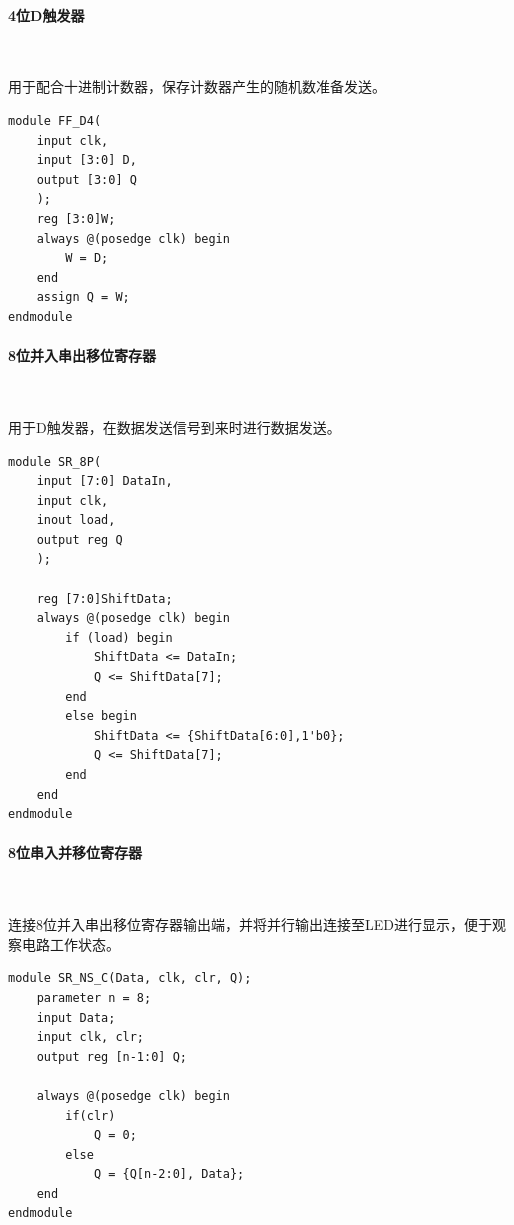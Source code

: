 \documentclass[UTF8]{ctexart}
\numberwithin{figure}{subsection}
\numberwithin{table}{subsection}
\numberwithin{equation}{subsection}
\begin{document}
\paragraph{4位D触发器}~
\par 用于配合十进制计数器，保存计数器产生的随机数准备发送。
\begin{lstlisting}[style={verilog-style}]
module FF_D4(
    input clk,
    input [3:0] D,
    output [3:0] Q
    );
    reg [3:0]W;
    always @(posedge clk) begin
        W = D;
    end
    assign Q = W;
endmodule
\end{lstlisting}

\paragraph{8位并入串出移位寄存器}~
\par 用于D触发器，在数据发送信号到来时进行数据发送。
\begin{lstlisting}[style={verilog-style}]
module SR_8P(
    input [7:0] DataIn,
    input clk,
    inout load,
    output reg Q
    );

    reg [7:0]ShiftData;
    always @(posedge clk) begin
        if (load) begin
            ShiftData <= DataIn;
            Q <= ShiftData[7];
        end
        else begin
            ShiftData <= {ShiftData[6:0],1'b0};
            Q <= ShiftData[7];
        end
    end
endmodule
\end{lstlisting}

\paragraph{8位串入并移位寄存器}~
\par 连接8位并入串出移位寄存器输出端，并将并行输出连接至LED进行显示，便于观察电路工作状态。
\begin{lstlisting}[style={verilog-style}]
module SR_NS_C(Data, clk, clr, Q);
    parameter n = 8;
    input Data;
    input clk, clr;
    output reg [n-1:0] Q;

    always @(posedge clk) begin
        if(clr)
            Q = 0;
        else
            Q = {Q[n-2:0], Data};
    end
endmodule
\end{lstlisting}
\end{document}

